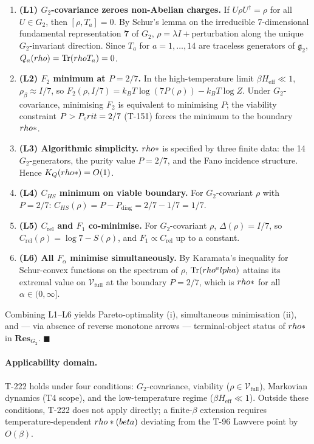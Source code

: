 \begin{enumerate}[leftmargin=2em,nosep]
  \item \textbf{(L1) $G_2$-covariance zeroes non-Abelian charges.}
        If $U\rho U^\dagger = \rho$ for all $U \in G_2$, then
        $[\rho, T_a] = 0$. By Schur's lemma on the irreducible
        7-dimensional fundamental representation $\mathbf 7$ of
        $G_2$, $\rho = \lambda I + \text{perturbation}$ along the
        unique $G_2$-invariant direction. Since $T_a$ for
        $a = 1,\ldots,14$ are traceless generators of $\mathfrak
        g_2$, $Q_a(rho) = \Tr(rho T_a) = 0$.
  \item \textbf{(L2) $F_2$ minimum at $P = 2/7$.} In the
        high-temperature limit $\beta H_{\mathrm{eff}} \ll 1$,
        $\rho_\beta \approx I/7$, so
        $F_2(\rho, I/7) = k_B T \log(7 P(\rho)) - k_B T \log Z$.
        Under $G_2$-covariance, minimising $F_2$ is equivalent to
        minimising $P$; the viability constraint $P > P_crit = 2/7$
        (T-151) forces the minimum to the boundary $rho*$.
  \item \textbf{(L3) Algorithmic simplicity.} $rho*$ is
        specified by three finite data: the 14 $G_2$-generators,
        the purity value $P = 2/7$, and the Fano incidence
        structure. Hence $K_Q(rho*) = O(1)$.
  \item \textbf{(L4) $C_{HS}$ minimum on viable boundary.} For
        $G_2$-covariant $\rho$ with $P = 2/7$:
        $C_{HS}(\rho) = P - P_{\mathrm{diag}} = 2/7 - 1/7 = 1/7$.
  \item \textbf{(L5) $C_{\mathrm{rel}}$ and $F_1$ co-minimise.}
        For $G_2$-covariant $\rho$, $\Delta(\rho) = I/7$, so
        $C_{\mathrm{rel}}(\rho) = \log 7 - S(\rho)$, and
        $F_1 \propto C_{\mathrm{rel}}$ up to a constant.
  \item \textbf{(L6) All $F_\alpha$ minimise simultaneously.} By
        Karamata's inequality for Schur-convex functions on the
        spectrum of $\rho$, $\Tr(rho^alpha)$ attains its extremal
        value on $\mathcal V_{\mathrm{full}}$ at the boundary
        $P = 2/7$, which is $rho*$ for all
        $\alpha \in (0, \infty]$.
\end{enumerate}
Combining L1--L6 yields Pareto-optimality (i), simultaneous
minimisation (ii), and --- via absence of reverse monotone arrows ---
terminal-object status of $rho*$ in $\mathbf{Res}_{G_2}$.
\hfill$\blacksquare$

\paragraph{Applicability domain.} T-222 holds under four
conditions: $G_2$-covariance, viability ($\rho \in \mathcal
V_{\mathrm{full}}$), Markovian dynamics (T4 scope), and the
low-temperature regime ($\beta H_{\mathrm{eff}} \ll 1$). Outside
these conditions, T-222 does not apply directly; a finite-$\beta$
extension requires temperature-dependent $rho*(beta)$
deviating from the T-96 Lawvere point by $O(\beta)$.


